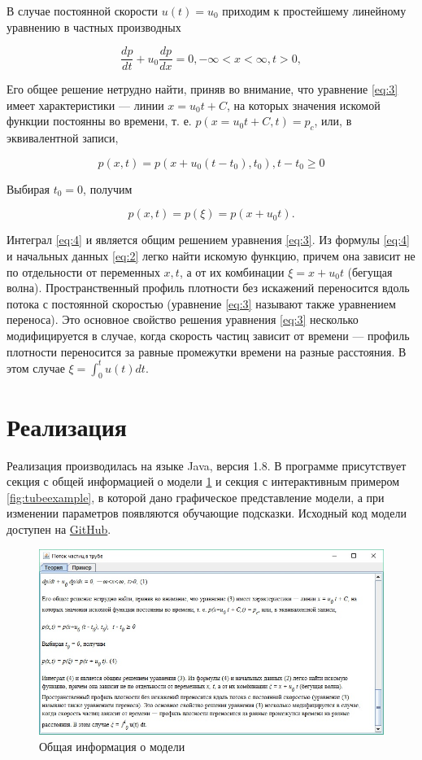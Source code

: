 		В случае постоянной скорости $ u(t) = u_0 $ приходим к простейшему
		линейному уравнению в частных производных
		
		
		\begin{equation} 
			\frac{dp}{dt} + u_0 \frac{dp}{dx} = 0, -\infty<x<\infty, t>0, 
			\label{eq:3} 
		\end{equation} 
		
		Его общее решение нетрудно найти, приняв во внимание, что
		уравнение \ref{eq:3} имеет характеристики — линии $ x = u_0 t + C $, на
		которых значения искомой функции постоянны во времени, т. е.
		$p(x=u_0 t + C,t) = p_c$, или, в эквивалентной записи,
		
		\begin{equation} p(x,t) = p(x+u_0 (t - t_0), t_0),  t - t_0 \ge 0 \end{equation}
		
		Выбирая $ t_0 = 0 $, получим
		
		\begin{equation} p(x,t) = p( \xi ) = p(x + u_0 t).  \label{eq:4} \end{equation}
		
		Интеграл \ref{eq:4} и является общим решением уравнения \ref{eq:3}. 
		Из формулы \ref{eq:4} и начальных данных \ref{eq:2} легко найти искомую функцию, 
		причем она зависит не по отдельности от переменных $ x, t $, 
		а от их комбинации $  \xi  = x + u_0 t$ (бегущая волна).
		Пространственный профиль плотности без 
		искажений переносится вдоль потока 
		с постоянной скоростью 
		(уравнение \ref{eq:3} называют также уравнением переноса). 
		Это основное свойство решения уравнения \ref{eq:3} 
		несколько модифицируется в случае,
		когда скорость частиц зависит от времени — профиль плотности 
		переносится за равные промежутки времени на разные расстояния.
		В этом случае $  \xi  = \int^t_0  u(t) dt$.

	\section{Реализация}
	
		Реализация производилась на языке Java, версия 1.8. В программе присутствует секция с общей информацией о модели \ref{fig:tubetheory} и секция с интерактивным примером \ref{fig:tubeexample}, в которой дано графическое представление модели, а при изменении параметров появляются обучающие подсказки. Исходный код модели доступен на \href{https://github.com/goto1134/mathmodels}{GitHub}.
	
		\begin{figure}[th]
			\centering
			\includegraphics[width=0.7\linewidth]{images/tube_theory}
			\caption{Общая информация о модели}
			\label{fig:tubetheory}
		\end{figure}
	
